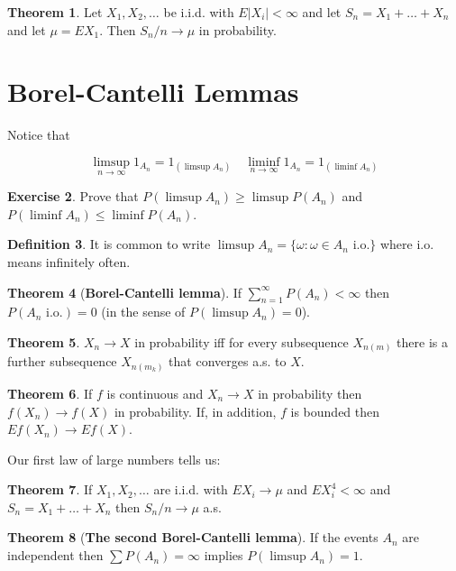 \documentclass{article}
\theoremstyle{definition}
\newtheorem{theorem}{Theorem}[section]
\newtheorem{definition}[theorem]{Definition}
\newtheorem{exercise}[theorem]{Exercise}
\begin{document}
\begin{theorem}
    Let $X_1, X_2, \dots$ be i.i.d. with $E|X_i| < \infty$ and let $S_n = X_1 + \dots + X_n$ and let $\mu = EX_1$. Then $S_n/n \to \mu$ in probability.
\end{theorem}

\pagebreak

\section{Borel-Cantelli Lemmas}

Notice that

$$ \limsup\limits_{n \to \infty} 1_{A_n} = 1_{(\limsup A_n)} \quad \liminf\limits_{n \to \infty} 1_{A_n} = 1_{(\liminf A_n)}$$

\begin{exercise}
    Prove that $P(\limsup A_n) \geq \limsup P(A_n)$ and $P(\liminf A_n) \leq \liminf P(A_n)$.
\end{exercise}

\begin{definition}
    It is common to write $\limsup A_n = \{ \omega : \omega \in A_n \text{ i.o.} \}$ where i.o. means infinitely often.
\end{definition}

\begin{theorem}[\textbf{Borel-Cantelli lemma}]
    If $\sum_{n=1}^\infty P(A_n) < \infty$ then $P(A_n \text{ i.o.}) = 0$
    (in the sense of $P(\limsup A_n)=0$).
\end{theorem}

\begin{theorem}
    $X_n \to X$ in probability iff for every subsequence $X_{n(m)}$ there is a further subsequence $X_{n(m_k)}$ that converges a.s. to $X$.
\end{theorem}

\begin{theorem}
    If $f$ is continuous and $X_n \to X$ in probability then $f(X_n) \to f(X)$ in probability. If, in addition, $f$ is bounded then $Ef(X_n) \to Ef(X)$.
\end{theorem}

Our first law of large numbers tells us:

\begin{theorem}
    If $X_1, X_2, \dots$ are i.i.d. with $EX_i \to \mu$ and $EX_i^4 < \infty$ and $S_n = X_1 + \dots + X_n$ then $S_n/n \to \mu$ a.s.
\end{theorem}

\begin{theorem}[\textbf{The second Borel-Cantelli lemma}]
    If the events $A_n$ are independent then $\sum P(A_n) = \infty$ implies $P(\limsup A_n) = 1$.
\end{theorem}
\end{document}

